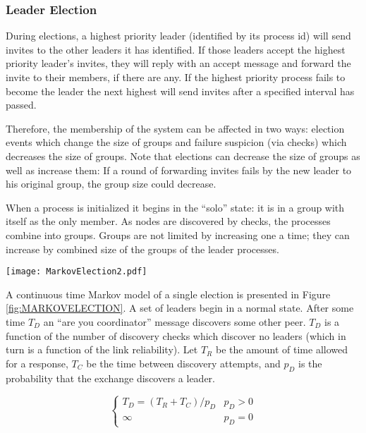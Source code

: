 \subsubsection{Leader Election}
During elections, a highest priority leader (identified by its process id) will
send invites to the other leaders it has identified. If those leaders accept
the highest priority leader's invites, they will reply with an accept message
and forward the invite to their members, if there are any. If the highest
priority process fails to become the leader the next highest will send invites
after a specified interval has passed.

Therefore, the membership of the system can be affected in two ways: election
events which change the size of groups and failure suspicion (via checks) which
decreases the size of groups. Note that elections can decrease the size of
groups as well as increase them: If a round of forwarding invites fails by the
new leader to his original group, the group size could decrease.

When a process is initialized it begins in the ``solo'' state: it is in a group
with itself as the only member. As nodes are discovered by checks, the
processes combine into groups. Groups are not limited by increasing one a time;
they can increase by combined size of the groups of the leader processes.



\begin{figure*}
\centering
\texttt{[image: MarkovElection2.pdf]}
\caption{A diagram showing a partial Markov chain for an election}
\label{fig:MARKOVELECTION}
\end{figure*}

A continuous time Markov model of a single election is presented in Figure \ref{fig:MARKOVELECTION}.
A set of leaders begin in a normal state. After some time $T_{D}$ an ``are you coordinator''
message discovers some other peer. $T_{D}$ is a function of the number of discovery
checks which discover no leaders (which in turn is a function of the link reliability). Let
$T_{R}$ be the amount of time allowed for a response, $T_{C}$ be the time between
discovery attempts, and $p_{D}$ is the probability that the exchange discovers a leader.

\begin{equation}
\begin{cases}
T_{D} = ( T_{R}+T_{C} ) / p_{D} & p_{D} > 0 \\
\infty & p_{D} = 0
\end{cases}
\end{equation}

